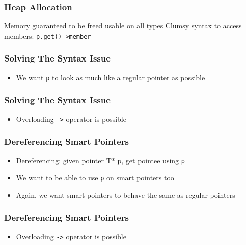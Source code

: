 \documentclass{../ucll-slides}
\begin{document}
\begin{frame}
  \frametitle{Heap Allocation}
  \begin{procontralist}
    \pro Memory guaranteed to be freed
     usable on all types
    \con Clumsy syntax to access members: {\tt p.get()->member}
  \end{procontralist}
\end{frame}

\begin{frame}
  \frametitle{Solving The Syntax Issue}
  \begin{itemize}
    \item We want {\tt p} to look as much like a regular pointer as possible
  \end{itemize}
\end{frame}

\begin{frame}
  \frametitle{Solving The Syntax Issue}
  \begin{itemize}
    \item Overloading {\tt ->} operator is possible
  \end{itemize}
\end{frame}

\begin{frame}
  \frametitle{Dereferencing Smart Pointers}
  \begin{itemize}
    \item Dereferencing: given pointer {T* p}, get pointee using {\tt *p}
    \item We want to be able to use {\tt *p} on smart pointers too
    \item Again, we want smart pointers to behave the same as regular pointers
  \end{itemize}
\end{frame}

\begin{frame}
  \frametitle{Dereferencing Smart Pointers}
  \begin{itemize}
    \item Overloading {\tt ->} operator is possible
  \end{itemize}
\end{frame}
\end{document}
